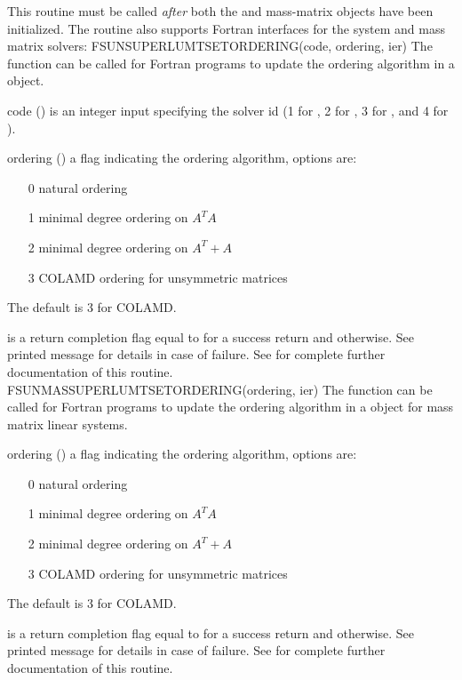 {
  This routine must be
  called \emph{after} both the {\nvector} and {\sunmatrix} mass-matrix
  objects have been initialized.
}
The  routine also supports Fortran
interfaces for the system and mass matrix solvers:
%
%
{
  FSUNSUPERLUMTSETORDERING(code, ordering, ier)
}
{
  The function  can be called for Fortran programs
  to update the ordering algorithm in a {\sunlinsolslumt} object.
}
{
  \begin{args}[ordering]
  \item[code] ()
    is an integer input specifying the solver id (1 for {\cvode}, 2
    for {\ida}, 3 for {\kinsol}, and 4 for {\arkode}).
  \item[ordering] ()
    a flag indicating the ordering algorithm, options are:
    \begin{itemize}
    \item[0] natural ordering
    \item[1] minimal degree ordering on $A^TA$
    \item[2] minimal degree ordering on $A^T+A$
    \item[3] COLAMD ordering for unsymmetric matrices
    \end{itemize}
    The default is 3 for COLAMD.
  \end{args}
}
{
   is a  return completion flag equal to  for a success
  return and  otherwise. See printed message for details in case
  of failure.
}
{
  See  for complete further
  documentation of this routine. 
}
%
%
{
  FSUNMASSUPERLUMTSETORDERING(ordering, ier)
}
{
  The function  can be called for Fortran
  programs to update the ordering algorithm in a {\sunlinsolslumt}
  object for mass matrix linear systems.
}
{
  \begin{args}[ordering]
  \item[ordering] ()
    a flag indicating the ordering algorithm, options are:
    \begin{itemize}
    \item[0] natural ordering
    \item[1] minimal degree ordering on $A^TA$
    \item[2] minimal degree ordering on $A^T+A$
    \item[3] COLAMD ordering for unsymmetric matrices
    \end{itemize}
    The default is 3 for COLAMD.
  \end{args}
}
{
   is a  return completion flag equal to  for a success
  return and  otherwise. See printed message for details in case
  of failure.
}
{
  See  for complete further
  documentation of this routine. 
}


